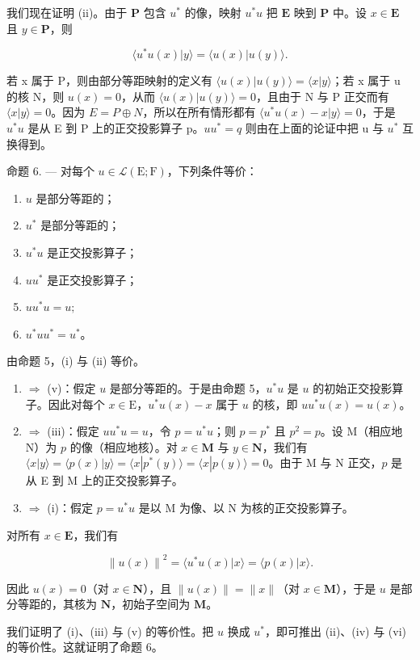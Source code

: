 我们现在证明 (ii)。由于 \(\mathbf{P}\) 包含 \(u^{*}\) 的像，映射 \(u^{*}u\) 把 \(\mathbf{E}\) 映到 \(\mathbf{P}\) 中。设 \(x \in \mathbf{E}\) 且 \(y \in \mathbf{P}\)，则

\[
\langle u ^ {*} u (x) | y \rangle = \langle u (x) | u (y) \rangle .
\]

若 x 属于 P，则由部分等距映射的定义有 \(\langle u(x)|u(y)\rangle = \langle x|y\rangle\)；若 x 属于 u 的核 N，则 \(u(x) = 0\)，从而 \(\langle u(x)|u(y)\rangle = 0\)，且由于 N 与 P 正交而有 \(\langle x|y\rangle = 0\)。因为 \(E = P \oplus N\)，所以在所有情形都有 \(\langle u^{*}u(x) - x|y\rangle = 0\)，于是 \(u^{*}u\) 是从 E 到 P 上的正交投影算子 p。\(uu^{*} = q\) 则由在上面的论证中把 u 与 \(u^{*}\) 互换得到。

命题 6. --- 对每个 \(u \in \mathcal{L}(\mathrm{E};\mathrm{F})\)，下列条件等价：

\begin{enumerate}
\def\labelenumi{(\roman{enumi})}
\item
  \(u\) 是部分等距的；
\item
  \(u^{*}\) 是部分等距的；
\item
  \(u^{*}u\) 是正交投影算子；
\item
  \(uu^{*}\) 是正交投影算子；
\item
  \(uu^{*}u = u;\)
\item
  \(u^{*}uu^{*} = u^{*}\)。
\end{enumerate}

由命题 5，(i) 与 (ii) 等价。

\begin{enumerate}
\def\labelenumi{(\roman{enumi})}
\item
  \(\Rightarrow\) (v)：假定 \(u\) 是部分等距的。于是由命题 5，\(u^{*}u\) 是 \(u\) 的初始正交投影算子。因此对每个 \(x \in \mathrm{E}\)，\(u^{*}u(x) - x\) 属于 \(u\) 的核，即 \(uu^{*}u(x) = u(x)\)。
\item
  \(\Rightarrow\) (iii)：假定 \(uu^{*}u = u\)，令 \(p = u^{*}u\)；则 \(p = p^{*}\) 且 \(p^2 = p\)。设 M（相应地 N）为 \(p\) 的像（相应地核）。对 \(x \in \mathbf{M}\) 与 \(y \in \mathbf{N}\)，我们有 \(\langle x|y\rangle = \langle p(x)|y\rangle = \langle x|p^{*}(y)\rangle = \langle x|p(y)\rangle = 0\)。由于 M 与 N 正交，\(p\) 是从 E 到 M 上的正交投影算子。
\item
  \(\Rightarrow\) (i)：假定 \(p = u^{*}u\) 是以 M 为像、以 N 为核的正交投影算子。
\end{enumerate}

对所有 \(x\in \mathbf{E}\)，我们有

\[
\left\| u (x) \right\| ^ {2} = \langle u ^ {*} u (x) | x \rangle = \langle p (x) | x \rangle .
\]

因此 \(u(x) = 0\)（对 \(x \in \mathbf{N}\)），且 \(\| u(x) \| = \| x \|\)（对 \(x \in \mathbf{M}\)），于是 \(u\) 是部分等距的，其核为 \(\mathbf{N}\)，初始子空间为 \(\mathbf{M}\)。

我们证明了 (i)、(iii) 与 (v) 的等价性。把 \(u\) 换成 \(u^*\)，即可推出 (ii)、(iv) 与 (vi) 的等价性。这就证明了命题 6。
